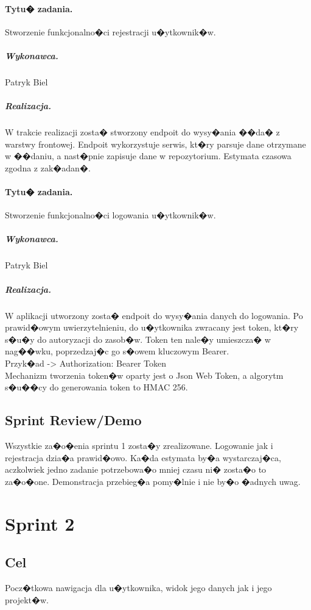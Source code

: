 ﻿\documentclass[a4paper]{article}
\begin{document}
\paragraph{Tytu� zadania.} Stworzenie funkcjonalno�ci rejestracji u�ytkownik�w.
\subparagraph{Wykonawca.} Patryk Biel
\subparagraph{Realizacja.} W trakcie realizacji zosta� stworzony endpoit do wysy�ania ��da� z warstwy frontowej. 
Endpoit wykorzystuje serwis, kt�ry parsuje dane otrzymane w ��daniu, a nast�pnie zapisuje dane w repozytorium. Estymata czasowa zgodna z zak�adan�.


\paragraph{Tytu� zadania.} Stworzenie funkcjonalno�ci logowania u�ytkownik�w.
\subparagraph{Wykonawca.} Patryk Biel
\subparagraph{Realizacja.} W aplikacji utworzony zosta� endpoit do wysy�ania danych do logowania. Po prawid�owym uwierzytelnieniu, do u�ytkownika zwracany jest token, kt�ry s�u�y do autoryzacji do zasob�w. Token ten nale�y umieszcza� w nag��wku, poprzedzaj�c go s�owem kluczowym Bearer. \\
Przyk�ad -> Authorization: Bearer Token\\
Mechanizm tworzenia token�w oparty jest o Json Web Token, a algorytm s�u��cy do generowania token to HMAC 256.



\subsection{Sprint Review/Demo}

Wszystkie za�o�enia sprintu 1 zosta�y zrealizowane. Logowanie jak i rejestracja dzia�a prawid�owo. Ka�da estymata by�a wystarczaj�ca, aczkolwiek jedno zadanie potrzebowa�o mniej czasu ni� zosta�o to za�o�one. Demonstracja przebieg�a pomy�lnie i nie by�o �adnych uwag. 






\section{Sprint 2}

\subsection{Cel} Pocz�tkowa nawigacja dla u�ytkownika, widok jego danych jak i jego projekt�w.
\end{document}
